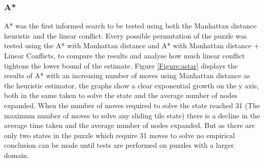 \documentclass[final]{cmpreport}
\begin{document}
\subsubsection{A*}
A* was the first informed search to be tested using both the Manhattan distance heuristic and the linear conflict. Every possible permutation of the puzzle was tested using the A* with Manhattan distance and A* with Manhattan distance + Linear Conflicts, to compare the results and analyse how much linear conflict tightens the lower bound of the estimate. Figure \ref{Figure:astar} displays the results of A* with an increasing number of moves using Manhattan distance as the heuristic estimator, the graphs show a clear exponential growth on the y axis, both in the same taken to solve the state and the average number of nodes expanded. When the number of moves required to solve the state reached 31 (The maximum number of moves to solve any sliding tile state) there is a decline in the average time taken and the average number of nodes expanded. But as there are only two states in the puzzle which require 31 moves to solve no empirical conclusion can be made until tests are performed on puzzles with a larger domain.
\end{document}
